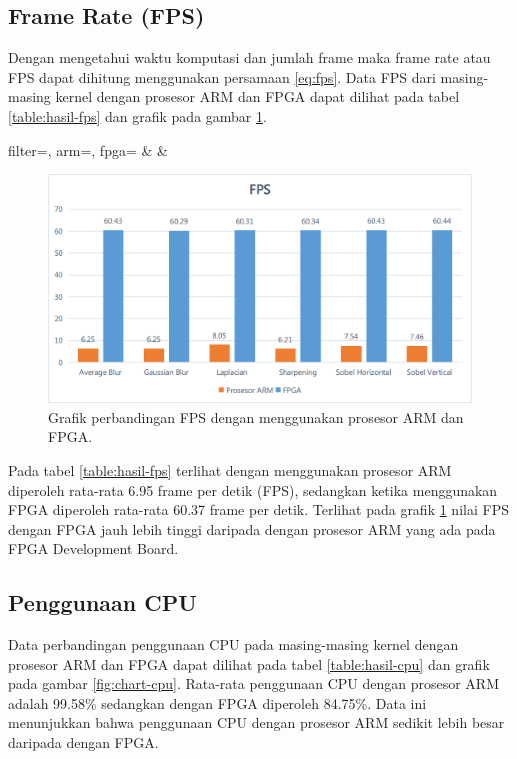 \subsection{Frame Rate (FPS)}
Dengan mengetahui waktu komputasi dan jumlah frame maka frame rate atau FPS dapat dihitung menggunakan persamaan \ref{eq:fps}. Data FPS dari masing-masing kernel dengan prosesor ARM dan FPGA dapat dilihat pada tabel \ref{table:hasil-fps} dan grafik pada gambar \ref{fig:chart-fps}.
\begin{atable}
    \caption{Tabel perbandingan FPS dengan menggunakan prosesor ARM dan FPGA.}
    \label{table:hasil-fps}
        {
            filter=\filter, 
            arm=\arm, 
            fpga=\fpga}
        {
            \filter & 
            \arm & 
            \fpga }
\end{atable}
\begin{figure}[H]
    \includegraphics[width=0.81\linewidth, center]{images/chart/chart-fps.png}
    \caption{Grafik perbandingan FPS dengan menggunakan prosesor ARM dan FPGA.}
    \label{fig:chart-fps}
\end{figure}

Pada tabel \ref{table:hasil-fps} terlihat dengan menggunakan prosesor ARM diperoleh rata-rata 6.95 frame per detik (FPS), sedangkan ketika menggunakan FPGA diperoleh rata-rata 60.37 frame per detik. Terlihat pada grafik \ref{fig:chart-fps} nilai FPS dengan FPGA jauh lebih tinggi daripada dengan prosesor ARM yang ada pada FPGA Development Board.


\subsection{Penggunaan CPU}
Data perbandingan penggunaan CPU pada masing-masing kernel dengan prosesor ARM dan FPGA dapat dilihat pada tabel \ref{table:hasil-cpu} dan grafik pada gambar \ref{fig:chart-cpu}. Rata-rata penggunaan CPU dengan prosesor ARM adalah 99.58\% sedangkan dengan FPGA diperoleh 84.75\%. Data ini menunjukkan bahwa penggunaan CPU dengan prosesor ARM sedikit lebih besar daripada dengan FPGA.

